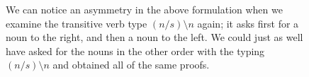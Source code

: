 \begin{figure}[h!]
\centering
{}
\caption{We can notice an asymmetry in the above formulation when we examine the transitive verb type $(n/s)\setminus n$ again; it asks first for a noun to the right, and then a noun to the left. We could just as well have asked for the nouns in the other order with the typing $(n/s)\setminus n$ and obtained all of the same proofs.}
\end{figure}

